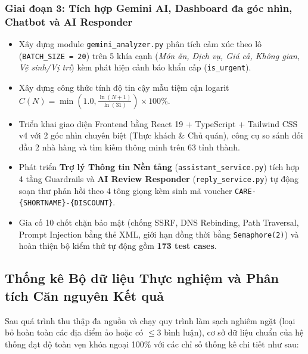 \documentclass[12pt, a4paper]{article}
\begin{document}
\subsubsection{Giai đoạn 3: Tích hợp Gemini AI, Dashboard đa góc nhìn, Chatbot và AI Responder}
\begin{itemize}[leftmargin=1.2cm]
    \item Xây dựng module \texttt{gemini\_analyzer.py} phân tích cảm xúc theo lô (\texttt{BATCH\_SIZE = 20}) trên 5 khía cạnh (\textit{Món ăn, Dịch vụ, Giá cả, Không gian, Vệ sinh/Vị trí}) kèm phát hiện cảnh báo khẩn cấp (\texttt{is\_urgent}).
    \item Xây dựng công thức tính độ tin cậy mẫu tiệm cận logarit $C(N) = \min\left(1.0, \frac{\ln(N+1)}{\ln(31)}\right) \times 100\%$.
    \item Triển khai giao diện Frontend bằng React 19 + TypeScript + Tailwind CSS v4 với 2 góc nhìn chuyên biệt (Thực khách \& Chủ quán), công cụ so sánh đối đầu 2 nhà hàng và tìm kiếm thông minh trên 63 tỉnh thành.
    \item Phát triển \textbf{Trợ lý Thông tin Nền tảng} (\texttt{assistant\_service.py}) tích hợp 4 tầng Guardrails và \textbf{AI Review Responder} (\texttt{reply\_service.py}) tự động soạn thư phản hồi theo 4 tông giọng kèm sinh mã voucher \texttt{CARE-\{SHORTNAME\}-\{DISCOUNT\}}.
    \item Gia cố 10 chốt chặn bảo mật (chống SSRF, DNS Rebinding, Path Traversal, Prompt Injection bằng thẻ XML, giới hạn đồng thời bằng \texttt{Semaphore(2)}) và hoàn thiện bộ kiểm thử tự động gồm \textbf{173 test cases}.
\end{itemize}

\newpage
\subsection{Thống kê Bộ dữ liệu Thực nghiệm và Phân tích Căn nguyên Kết quả}
Sau quá trình thu thập đa nguồn và chạy quy trình làm sạch nghiêm ngặt (loại bỏ hoàn toàn các địa điểm ảo hoặc có $\le 3$ bình luận), cơ sở dữ liệu chuẩn của hệ thống đạt độ toàn vẹn khóa ngoại 100\% với các chỉ số thống kê chi tiết như sau:
\end{document}
